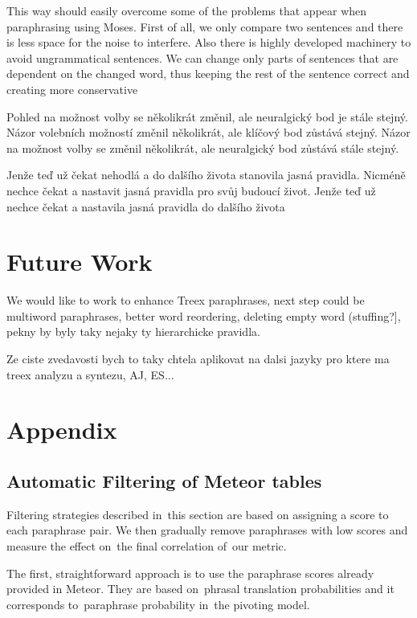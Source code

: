\documentclass[11pt]{article}
\begin{document}
This way should easily overcome some of the problems that appear when paraphrasing using 
Moses. First of all, we only compare two sentences and there is less space for %
the noise to interfere. Also there is highly developed machinery to avoid ungrammatical 
sentences. We can change only parts of sentences that are dependent on the changed 
word, thus keeping the rest of the sentence correct and creating more conservative 


Pohled na možnost volby se několikrát změnil, ale neuralgický bod je stále stejný.
Názor volebních možností změnil několikrát, ale klíčový bod zůstává stejný.
Názor na možnost volby se změnil několikrát, ale neuralgický bod zůstává stále stejný.

Jenže teď už čekat nehodlá a do dalšího života stanovila jasná pravidla.
Nicméně nechce čekat a nastavit jasná pravidla pro svůj budoucí život.
Jenže teď už nechce čekat a nastavila jasná pravidla do dalšího života


\section{Future Work}
We would like to work to enhance Treex paraphrases, next step could be multiword 
paraphrases, better word reordering, deleting empty word (stuffing?], pekny by byly
taky nejaky ty hierarchicke pravidla. 

Ze ciste zvedavosti bych to taky chtela aplikovat na dalsi jazyky pro ktere ma treex
analyzu a syntezu, AJ, ES...




\section*{Appendix}
\subsection*{Automatic Filtering of Meteor tables}
\label{multiword_filtering}
Filtering strategies described in~this section are based on assigning a score 
to each paraphrase pair. We then gradually remove paraphrases with low scores 
and measure the effect on~the final correlation of~our metric.

The first, straightforward approach is to use the paraphrase scores already
provided in Meteor. They are based on~phrasal translation probabilities and it 
corresponds to~paraphrase probability in~the pivoting model.
\end{document}
